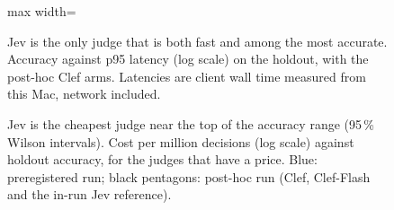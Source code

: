 \begin{figure}[tbp]
\centering

\begin{adjustbox}{max width=\linewidth}\end{adjustbox}
\caption{Jev is the only judge that is both fast and among the most accurate. Accuracy against p95 latency (log scale) on the holdout, with the post-hoc Clef arms. Latencies are client
wall time measured from this Mac, network included.}
\label{vt:fig:jbacclat}
\end{figure}

\begin{figure}[tbp]
\centering
{}\par\smallskip

\caption{Jev is the cheapest judge near the top of the accuracy range (95\,\% Wilson intervals). Cost per million decisions (log scale) against holdout accuracy, for the judges that have a price.
Blue: preregistered run; black pentagons: post-hoc run (Clef, Clef-Flash and the in-run Jev reference).}
\label{vt:fig:jbcost}
\end{figure}

